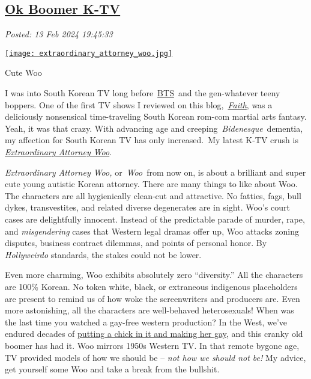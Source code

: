 %

\subsection*{\href{http://analyzethedatanotthedrivel.org/2024/02/13/ok-boomer-k-tv/}{Ok Boomer K-TV}}


\noindent\emph{Posted: 13 Feb 2024 19:45:33}
\vspace{6pt}

\captionsetup[floatingfigure]{labelformat=empty}
\begin{floatingfigure}[l]{0.24\textwidth}
\centering
\href{https://www.imdb.com/title/tt20869502/}{\texttt{[image: extraordinary\_attorney\_woo.jpg]}}
\label{fig:8005x0}
\caption[Extraordinary Attorney Woo]{Cute Woo}
\end{floatingfigure}I was into South Korean TV long
before~\href{https://kprofiles.com/bts-bangtan-boys-members-profile/}{BTS}~and
the gen-whatever teeny boppers. One of the first TV shows I reviewed on
this
blog,~\href{https://analyzethedatanotthedrivel.org/2012/09/02/faith-a-guilty-pleasure/}{\emph{Faith}},
was a deliciously nonsensical time-traveling South Korean rom-com
martial arts fantasy. Yeah, it was that crazy. With advancing age and
creeping~\emph{Bidenesque}~dementia, my affection for South Korean TV
has only increased.~My latest K-TV crush is
\href{https://www.imdb.com/title/tt20869502/}{\emph{Extraordinary Attorney
Woo}}.


\emph{Extraordinary Attorney Woo,} or~\emph{Woo}~from now on, is about a
brilliant and super cute young autistic Korean attorney. There are many
things to like about Woo. The characters are all hygienically clean-cut
and attractive. No fatties, fags, bull dykes, transvestites, and related
diverse degenerates are in sight. Woo's court cases are delightfully
innocent. Instead of the predictable parade of murder, rape, and
\emph{misgendering} cases that Western legal dramas offer up, Woo
attacks zoning disputes, business contract dilemmas, and points of
personal honor. By \emph{Hollyweirdo} standards, the stakes could not be
lower.

Even more charming, Woo exhibits absolutely zero ``diversity.'' All the
characters are 100\% Korean. No token white, black, or extraneous
indigenous placeholders are present to remind us of how woke the
screenwriters and producers are. Even more astonishing, all the
characters are well-behaved heterosexuals! When was the last time you
watched a gay-free western production? In the West, we've endured
decades of \href{https://www.youtube.com/watch?v=9vJDcCcANnU}{putting a
chick in it and making her gay}, and this cranky old boomer has had it.
Woo mirrors 1950s Western TV. In that remote bygone age, TV provided
models of how we should be -- \emph{not how we should not be!} My
advice, get yourself some Woo and take a break from the bullshit.


%

